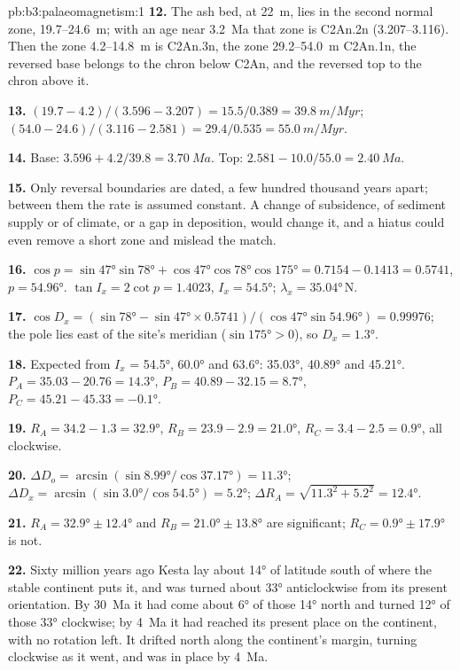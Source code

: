 \begin{solution}{pb:b3:palaeomagnetism:1}
\textbf{12.} The ash bed, at \qty{22}{m}, lies in the second normal zone,
19.7--\qty{24.6}{m}; with an age near \qty{3.2}{Ma} that zone is C2An.2n
(3.207--3.116). Then the zone 4.2--\qty{14.8}{m} is C2An.3n, the zone
29.2--\qty{54.0}{m} C2An.1n, the reversed base belongs to the chron below
C2An, and the reversed top to the chron above it.

\textbf{13.} $(19.7 - 4.2)/(3.596 - 3.207) = 15.5/0.389 = \qty{39.8}{m/Myr}$;
$(54.0 - 24.6)/(3.116 - 2.581) = 29.4/0.535 = \qty{55.0}{m/Myr}$.

\textbf{14.} Base: $3.596 + 4.2/39.8 = \qty{3.70}{Ma}$. Top: $2.581 -
10.0/55.0 = \qty{2.40}{Ma}$.

\textbf{15.} Only reversal boundaries are dated, a few hundred thousand years
apart; between them the rate is assumed constant. A change of subsidence, of
sediment supply or of climate, or a gap in deposition, would change it, and a
hiatus could even remove a short zone and mislead the match.

\textbf{16.} $\cos p = \sin\ang{47}\sin\ang{78} + \cos\ang{47}\cos\ang{78}
\cos\ang{175} = 0.7154 - 0.1413 = 0.5741$, $p = \ang{54.96}$. $\tan I_x =
2\cot p = 1.4023$, $I_x = \ang{54.5}$; $\lambda_x = \ang{35.04}$\,N.

\textbf{17.} $\cos D_x = (\sin\ang{78} - \sin\ang{47}\times0.5741)/
(\cos\ang{47}\sin\ang{54.96}) = 0.99976$; the pole lies east of the site's
meridian ($\sin\ang{175} > 0$), so $D_x = \ang{1.3}$.

\textbf{18.} Expected  from $I_x$ = \ang{54.5}, \ang{60.0} and
\ang{63.6}: \ang{35.03}, \ang{40.89} and \ang{45.21}. $P_A = 35.03 - 20.76 =
\ang{14.3}$, $P_B = 40.89 - 32.15 = \ang{8.7}$, $P_C = 45.21 - 45.33 =
\ang{-0.1}$.

\textbf{19.} $R_A = 34.2 - 1.3 = \ang{32.9}$, $R_B = 23.9 - 2.9 = \ang{21.0}$,
$R_C = 3.4 - 2.5 = \ang{0.9}$, all clockwise.

\textbf{20.} $\Delta D_o = \arcsin(\sin\ang{8.99}/\cos\ang{37.17}) = \ang{11.3}$;
$\Delta D_x = \arcsin(\sin\ang{3.0}/\cos\ang{54.5}) = \ang{5.2}$; $\Delta R_A =
\sqrt{11.3^2 + 5.2^2} = \ang{12.4}$.

\textbf{21.} $R_A = \ang{32.9} \pm \ang{12.4}$ and $R_B = \ang{21.0} \pm
\ang{13.8}$ are significant; $R_C = \ang{0.9} \pm \ang{17.9}$ is not.

\textbf{22.} Sixty million years ago Kesta lay about \ang{14} of latitude
south of where the stable continent puts it, and was turned about \ang{33}
anticlockwise from its present orientation. By \qty{30}{Ma} it had come about
\ang{6} of those \ang{14} north and turned \ang{12} of those \ang{33}
clockwise; by \qty{4}{Ma} it had reached its present place on the continent,
with no rotation left. It drifted north along the continent's margin, turning
clockwise as it went, and was in place by \qty{4}{Ma}.


\end{solution}
